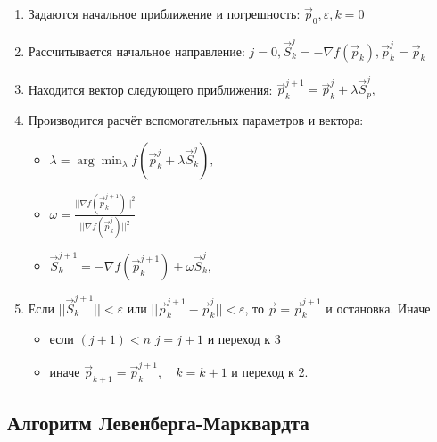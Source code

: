 \begin{enumerate}
	\item Задаются начальное приближение и погрешность: $\vec {p}_{0}, \varepsilon, k=0$
	\item Рассчитывается начальное направление: $j=0, {\vec {S}}_{k}^{j}=-\nabla f({\vec {p}}_{k}), {\vec {p}}_{k}^{j}={\vec {p}}_{k}$
	\item Находится вектор следующего приближения: ${\vec {p}}_{k}^{j+1}={\vec {p}}_{k}^{j}+\lambda {\vec {S}}_{p}^{j},$ 
	\item Производится расчёт вспомогательных параметров и вектора:
	\begin{itemize}
		\item $\lambda =\arg \min _{\lambda }f({\vec {p}}_{k}^{j}+\lambda {\vec {S}}_{k}^{j}),$
		\item $\omega ={\frac {||\nabla f({\vec {p}}_{k}^{j+1})||^{2}}{||\nabla f({\vec {p}}_{k}^{j})||^{2}}}$
		\item ${\vec {S}}_{k}^{j+1}=-\nabla f({\vec {p}}_{k}^{j+1})+\omega {\vec {S}}_{k}^{j},$
	\end{itemize}
	
	\item Если $||{\vec {S}}_{k}^{j+1}||<\varepsilon $ или $\displaystyle ||{\vec {p}}_{k}^{j+1}-{\vec {p}}_{k}^{j}||<\varepsilon $, то ${\vec {p}}={\vec {p}}_{k}^{j+1}$ и остановка.
	Иначе
	\begin{itemize}
		\item если $(j+1)<n$ $\displaystyle j=j+1$ и переход к 3
		\item иначе ${\vec {p}}_{k+1}={\vec {p}}_{k}^{j+1},\quad k=k+1$ и переход к 2.
	\end{itemize}
\end{enumerate}

\subsection{Алгоритм Левенберга-Марквардта}

